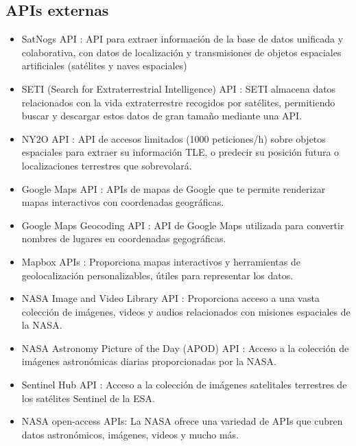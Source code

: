 \subsection*{APIs externas}
\begin{itemize}
  \item SatNogs API \cite{satnogs-api}: API para extraer información de la base de datos unificada y colaborativa, con datos de localización y transmisiones de objetos espaciales artificiales (satélites y naves espaciales)
  \item SETI (Search for Extraterrestrial Intelligence) API \cite{seti-api}: SETI almacena datos relacionados con la vida extraterrestre recogidos por satélites, permitiendo buscar y descargar estos datos de gran tamaño mediante una API.
  \item NY2O API \cite{ny2o-api}: API de accesos limitados (1000 peticiones/h) sobre objetos espaciales para extraer su información TLE, o predecir su posición futura o localizaciones terrestres que sobrevolará.
  
  \item Google Maps API \cite{google-maps-api}: APIs de mapas de Google que te permite renderizar mapas interactivos con coordenadas geográficas.
  \item Google Maps Geocoding API \cite{google-maps-geocoding-api}: API de Google Maps utilizada para convertir nombres de lugares en coordenadas gegográficas.
  \item Mapbox APIs \cite{mapbox-api}: Proporciona mapas interactivos y herramientas de geolocalización personalizables, útiles para representar los datos.
  
  \item NASA Image and Video Library API \cite{nasa-media-library-api}: Proporciona acceso a una vasta colección de imágenes, videos y audios relacionados con misiones espaciales de la NASA.
  \item NASA Astronomy Picture of the Day (APOD) API \cite{nasa-apod-api}: Acceso a la colección de imágenes astronómicas diarias proporcionadas por la NASA.
  \item Sentinel Hub API \cite{sentinel-api}: Acceso a la colección de imágenes satelitales terrestres de los satélites Sentinel de la ESA.
  
  \item NASA open-access APIs\cite{nasa-open-api}: La NASA ofrece una variedad de APIs que cubren datos astronómicos, imágenes, videos y mucho más.
\end{itemize}